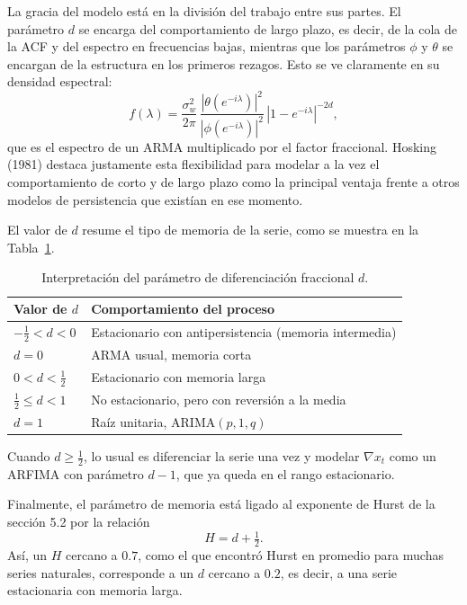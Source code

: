 \documentclass[legalpaper,11pt]{article}
\begin{document}
\begin{enumerate}
La gracia del modelo est\'a en la divisi\'on del trabajo entre sus partes. El par\'ametro $d$ se encarga del comportamiento de largo plazo, es decir, de la cola de la ACF y del espectro en frecuencias bajas, mientras que los par\'ametros $\phi$ y $\theta$ se encargan de la estructura en los primeros rezagos. Esto se ve claramente en su densidad espectral:
\begin{equation}
f(\lambda) = \frac{\sigma_w^{2}}{2\pi}\, \frac{|\theta(e^{-i\lambda})|^{2}}{|\phi(e^{-i\lambda})|^{2}}\, \left| 1 - e^{-i\lambda} \right|^{-2d},
\end{equation}
que es el espectro de un ARMA multiplicado por el factor fraccional. Hosking (1981) destaca justamente esta flexibilidad para modelar a la vez el comportamiento de corto y de largo plazo como la principal ventaja frente a otros modelos de persistencia que exist\'ian en ese momento.

El valor de $d$ resume el tipo de memoria de la serie, como se muestra en la Tabla~\ref{tab:d}.

\begin{table}[H]
\centering
\begin{tabular}{ll}
\hline
\textbf{Valor de $d$} & \textbf{Comportamiento del proceso} \\
\hline
$-\tfrac{1}{2} < d < 0$ & Estacionario con antipersistencia (memoria intermedia) \\
$d = 0$ & ARMA usual, memoria corta \\
$0 < d < \tfrac{1}{2}$ & Estacionario con memoria larga \\
$\tfrac{1}{2} \le d < 1$ & No estacionario, pero con reversi\'on a la media \\
$d = 1$ & Ra\'iz unitaria, ARIMA$(p,1,q)$ \\
\hline
\end{tabular}
\caption{Interpretaci\'on del par\'ametro de diferenciaci\'on fraccional $d$.}
\label{tab:d}
\end{table}

Cuando $d \ge \tfrac{1}{2}$, lo usual es diferenciar la serie una vez y modelar $\nabla x_t$ como un ARFIMA con par\'ametro $d-1$, que ya queda en el rango estacionario.

Finalmente, el par\'ametro de memoria est\'a ligado al exponente de Hurst de la secci\'on 5.2 por la relaci\'on
\begin{equation}
H = d + \tfrac{1}{2}.
\end{equation}
As\'i, un $H$ cercano a $0.7$, como el que encontr\'o Hurst en promedio para muchas series naturales, corresponde a un $d$ cercano a $0.2$, es decir, a una serie estacionaria con memoria larga.


\end{enumerate}
\end{document}
